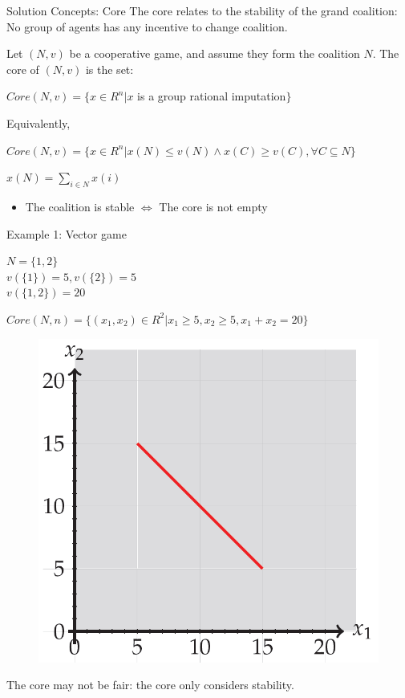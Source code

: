 \documentclass{beamer}
\begin{document}
\begin{frame} {Solution Concepts: Core}
    The core relates to the stability of the grand coalition: \\ No group of agents has any incentive to change coalition.
    \begin{definition}\label{dfn:core}
        Let $(N,v)$ be a cooperative game, and assume they form the coalition $N$. The core of $(N,v)$ is the set:
        \vspace{0.1cm}
        \begin{center}
            $Core(N,v) = \{x \in R^n | x$ is a group rational imputation$\}$
        \end{center}
        Equivalently,
        \vspace{0.1cm}
        \begin{center}
            $Core(N,v) = \{x \in R^n | x(N) \leq v(N) \wedge x(C) \geq v(C), \forall C \subseteq N\}$ \\
        \end{center}
        \small{$x(N) = \sum_{i \in N} x(i)$}
    \end{definition}

    \begin{itemize}
       \item The coalition is stable $\Leftrightarrow$ The core is not empty
    \end{itemize}

\end{frame}
\begin{frame} {Example 1: Vector game}

    \begin{center}
      $N = \{1,2\}$ \\
      $v(\{1\}) = 5, v(\{2\}) = 5$ \\
      $v(\{1,2\}) = 20$ \\
    \end{center}

    $Core(N,n) = \{(x_1,x_2) \in R^2 | x_1 \geq 5, x_2 \geq 5, x_1 + x_2 = 20\}$

    \begin{figure}[htbp]
        \centering
        \includegraphics[width=0.3 \columnwidth]{figures/coreex1.png}
    \end{figure}

    The core may not be fair: the core only considers stability.

\end{frame}
\end{document}
